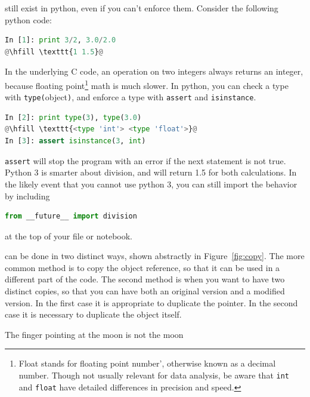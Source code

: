 \documentclass[justified, nobib]{tufte-handout}
\newcommand{\floatNote}{\footnote{ Float stands for floating
  point number', otherwise known as a decimal number. Though not usually
  relevant for data analysis, be aware that \texttt{int} and \texttt{float}
  have detailed differences in precision and speed.}}
\begin{document}
 still exist in python, even if you can't enforce
them. Consider the following python code:
\begin{adjustwidth}{2.5em}{0pt}
\begin{lstlisting}[language=Python]
In [1]: print 3/2, 3.0/2.0
@\hfill \texttt{1 1.5}@
\end{lstlisting}
\end{adjustwidth}

\noindent
In the underlying C code, an operation on two integers always returns an
integer, because floating point\floatNote{} \;math is much slower. In python,
you can check a type with \lstinline !type(!object\lstinline !)!, and enforce a
type with \lstinline !assert! and \lstinline !isinstance!.
\begin{adjustwidth}{2.5em}{0pt}
\begin{lstlisting}[language=Python]
In [2]: print type(3), type(3.0)
@\hfill \texttt{<type 'int'> <type 'float'>}@
In [3]: assert isinstance(3, int)
\end{lstlisting}
\end{adjustwidth}
\lstinline !assert! will stop the program with an error if the next statement is
not true. Python 3 is smarter about division, and will return 1.5 for both
calculations. In the likely event that you cannot use python 3, you can still
import the behavior by including
\begin{adjustwidth}{2.5em}{0pt}
\begin{lstlisting}[language=Python]
from __future__ import division
\end{lstlisting}
\end{adjustwidth}
at the top of your file or notebook.

 can be done in two distinct ways, shown abstractly
in Figure~\ref*{fig:copy}. The more common method is to copy the object
reference, so that it can be used in a different part of the code. The second
method is when you want to have two distinct copies, so that you can have both
an original version and a modified version. In the first case it is appropriate
to duplicate the pointer. In the second case it is necessary to duplicate the
object itself.


\smallskip
\begin{marginfigure}
    \vspace*{\fill}
    \centering
    \subfloat[Case 1]{\scalebox{1}{}}

    \vfill

    \subfloat[Case 2]{\scalebox{0.69}{}}
  \caption{The finger pointing at the moon is not the moon}
\label{fig:copy}
\end{marginfigure}
\end{document}
